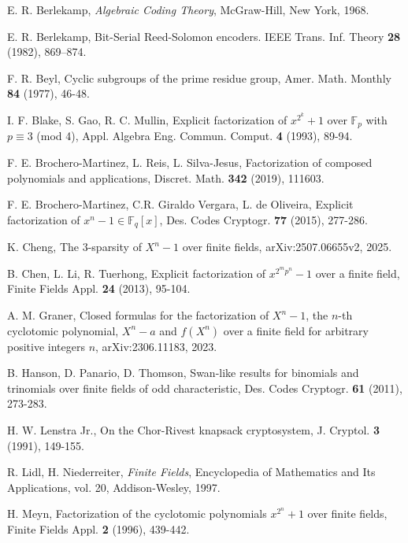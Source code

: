\documentclass[10pt,reqno]{amsart}
\theoremstyle{definition}
\theoremstyle{remark}
\numberwithin{equation}{section}
\begin{document}
\begin{thebibliography}{99}

\bibitem{[Ber68]} E. R. Berlekamp, \textit{Algebraic Coding Theory}, McGraw-Hill, New York, 1968.

\bibitem{[Ber82]} E. R. Berlekamp, Bit-Serial Reed-Solomon encoders. IEEE Trans. Inf. Theory \textbf{28} (1982), 869–874.

\bibitem{[Bey77]} F. R. Beyl, Cyclic subgroups of the prime residue group, Amer. Math. Monthly \textbf{84} (1977), 46-48.

\bibitem{[BGM93]} I. F. Blake, S. Gao, R. C. Mullin, Explicit factorization of $x^{2^k} + 1$ over $\mathbb{F}_p$ with $p \equiv 3$ (mod 4), Appl. Algebra Eng. Commun. Comput. \textbf{4} (1993), 89-94.

\bibitem{[BRS19]} F. E. Brochero-Martinez, L. Reis, L. Silva-Jesus, Factorization of composed polynomials and applications, Discret. Math. \textbf{342} (2019), 111603.

\bibitem{[BMOV15]} F. E. Brochero-Martinez, C.R. Giraldo Vergara, L. de Oliveira, Explicit factorization of $x^{n} - 1 \in \mathbb{F}_q[x]$, Des. Codes Cryptogr. \textbf{77} (2015), 277-286.

\bibitem{[C25]} K. Cheng, The $3$-sparsity of $X^n-1$ over finite fields, arXiv:2507.06655v2, 2025.

\bibitem{[CLT13]} B. Chen, L. Li, R. Tuerhong, Explicit factorization of $x^{2^m p^n} - 1$ over a finite field, Finite Fields Appl. \textbf{24} (2013), 95-104.

\bibitem{[Gra23]} A. M. Graner, Closed formulas for the factorization of $X^n - 1$, the $n$-th cyclotomic polynomial, $X^n - a$ and $f(X^n)$ over a finite field for arbitrary positive integers $n$,  arXiv:2306.11183, 2023.

\bibitem{[HPT11]} B. Hanson, D. Panario, D. Thomson, Swan-like results for binomials and trinomials over finite fields of odd characteristic, Des. Codes Cryptogr. \textbf{61} (2011), 273-283.

\bibitem{[Len91]} H. W. Lenstra Jr., On the Chor-Rivest knapsack cryptosystem, J. Cryptol. \textbf{3} (1991), 149-155.

\bibitem{[LN97]} R. Lidl, H. Niederreiter, \textit{Finite Fields}, Encyclopedia of Mathematics and Its Applications, vol. 20, Addison-Wesley, 1997.

\bibitem{[Mey96]} H. Meyn, Factorization of the cyclotomic polynomials $x^{2^n} + 1$ over finite fields, Finite Fields Appl. \textbf{2} (1996), 439-442.


\end{thebibliography}
\end{document}

